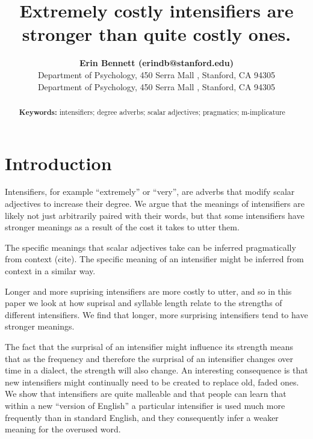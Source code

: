 \documentclass[10pt,letterpaper]{article}
\title{Extremely costly intensifiers are stronger than quite costly ones.}
\author{{\large \bf Erin Bennett (erindb@stanford.edu)} \\
  Department of Psychology, 450 Serra Mall , Stanford, CA 94305
  \AND {\large \bf Noah Goodman (ngoodman@stanford.edu)} \\
  Department of Psychology, 450 Serra Mall , Stanford, CA 94305}
\begin{document}
\maketitle


\begin{abstract}


\textbf{Keywords:} 
intensifiers; degree adverbs; scalar adjectives; pragmatics; m-implicature
\end{abstract}


\section{Introduction}


Intensifiers, for example ``extremely'' or ``very'', are adverbs that modify scalar adjectives to increase their degree.
We argue that the meanings of intensifiers are likely not just arbitrarily paired with their words, but that some intensifiers have stronger meanings as a result of the cost it takes to utter them.

The specific meanings that scalar adjectives take can be inferred pragmatically from context (cite).
The specific meaning of an intensifier might be inferred from context in a similar way.

Longer and more suprising intensifiers are more costly to utter, and so in this paper we look at how suprisal and syllable length relate to the strengths of different intensifiers.
We find that longer, more surprising intensifiers tend to have stronger meanings.

The fact that the surprisal of an intensifier might influence its strength means that as the frequency and therefore the surprisal of an intensifier changes over time in a dialect, the strength will also change.
An interesting consequence  is that new intensifiers might continually need to be created to replace old, faded ones.
We show that intensifiers are quite malleable and that people can learn that within a new ``version of English'' a particular intensifier is used much more frequently than in standard English, and they consequently infer a weaker meaning for the overused word.
\end{document}
